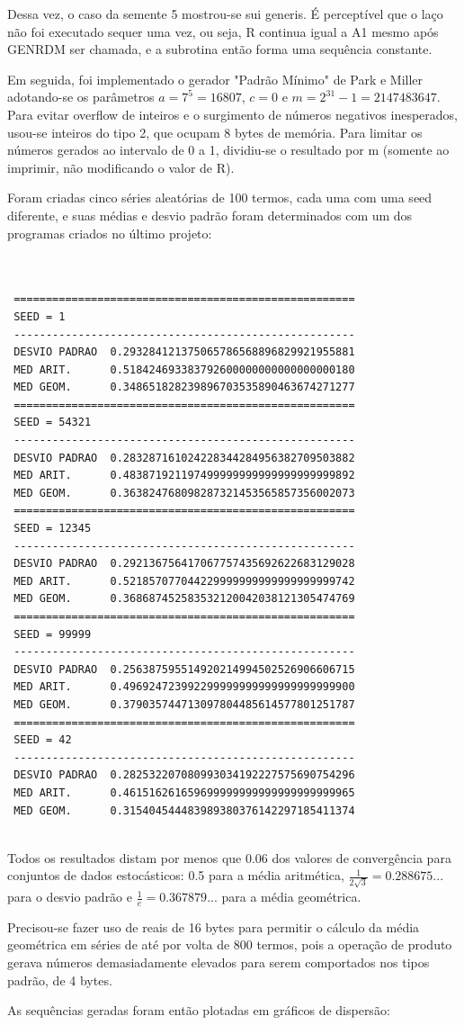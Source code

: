 \documentclass{article}
\begin{document}
Dessa vez, o caso da semente 5 mostrou-se sui generis. É perceptível que o laço não foi executado sequer uma vez, ou seja, R continua igual a A1 mesmo após GENRDM ser chamada, e a subrotina então forma uma sequência constante.

Em seguida, foi implementado o gerador "Padrão Mínimo" de Park e Miller adotando-se os parâmetros \(a = 7^5 = 16807\), \(c = 0\) e \(m = 2^{31}-1 = 2147483647\). Para evitar overflow de inteiros e o surgimento de números negativos inesperados, usou-se inteiros do tipo 2, que ocupam 8 bytes de memória. Para limitar os números gerados ao intervalo de 0 a 1, dividiu-se o resultado por m (somente ao imprimir, não modificando o valor de R).\par
Foram criadas cinco séries aleatórias de 100 termos, cada uma com uma seed diferente, e suas médias e desvio padrão foram determinados com um dos programas criados no último projeto:

\begin{lstlisting}


 =====================================================
 SEED = 1
 -----------------------------------------------------
 DESVIO PADRAO  0.293284121375065786568896829921955881      
 MED ARIT.      0.518424693383792600000000000000000180      
 MED GEOM.      0.348651828239896703535890463674271277      
 =====================================================
 SEED = 54321
 -----------------------------------------------------
 DESVIO PADRAO  0.283287161024228344284956382709503882      
 MED ARIT.      0.483871921197499999999999999999999892      
 MED GEOM.      0.363824768098287321453565857356002073      
 =====================================================
 SEED = 12345
 -----------------------------------------------------
 DESVIO PADRAO  0.292136756417067757435692622683129028      
 MED ARIT.      0.521857077044229999999999999999999742      
 MED GEOM.      0.368687452583532120042038121305474769      
 =====================================================
 SEED = 99999
 -----------------------------------------------------
 DESVIO PADRAO  0.256387595514920214994502526906606715      
 MED ARIT.      0.496924723992299999999999999999999900      
 MED GEOM.      0.379035744713097804485614577801251787      
 =====================================================
 SEED = 42
 -----------------------------------------------------
 DESVIO PADRAO  0.282532207080993034192227575690754296      
 MED ARIT.      0.461516261659699999999999999999999965      
 MED GEOM.      0.315404544483989380376142297185411374 


\end{lstlisting}
Todos os resultados distam por menos que 0.06 dos valores de convergência para conjuntos de dados estocásticos: 0.5 para a média aritmética, \(\frac{1}{2\sqrt{3}} = 0.288675...\) para o desvio padrão e \(\frac{1}{e}=0.367879...\) para a média geométrica.\par
Precisou-se fazer uso de reais de 16 bytes para permitir o cálculo da média geométrica em séries de até por volta de 800 termos, pois a operação de produto gerava números demasiadamente elevados para serem comportados nos tipos padrão, de 4 bytes.\par
As sequências geradas foram então plotadas em gráficos de dispersão:
\end{document}
